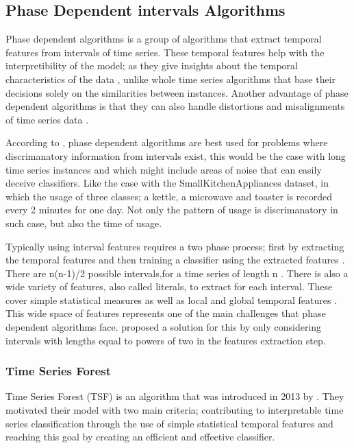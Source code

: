 \subsection{Phase Dependent intervals Algorithms}
\label{SubsectionPhaseDependent}
Phase dependent algorithms is a group of algorithms that extract temporal features from intervals of time series.
These temporal features help with the interpretibility of the model; as they give insights about the temporal characteristics of the data \cite{baydogan2016time},
unlike whole time series algorithms that base their decisions solely on the similarities between instances.
Another advantage of phase dependent algorithms is that they can also handle distortions and misalignments of time series data \cite{deng2013time}.

According to \cite{bagnall2017great}, phase dependent algorithms are best used for problems where discrimanatory information from intervals exist,
this would be the case with long time series instances and which might include areas of noise that can easily deceive classifiers.
Like the case with the SmallKitchenAppliances dataset, in which the usage of three classes; a kettle, a microwave and toaster is recorded every 2 minutes for one day.
Not only the pattern of usage is discrimanatory in such case, but also the time of usage.

Typically using interval features requires a two phase process; first by extracting the temporal features and then training a classifier using the extracted features \cite{deng2013time}.
There are n(n-1)/2 possible intervals,for a time series of length n \cite{bagnall2017great}.
There is also a wide variety of features, also called literals, to extract for each interval. These cover simple statistical measures as well as local and global temporal features \cite{santos2016literature,rodriguez2004support,deng2013time}.
This wide space of features represents one of the main challenges that phase dependent algorithms face.
\cite{rodriguez2004support} proposed a solution for this by only considering intervals with lengths equal to powers of two \cite{bagnall2017great} in the features extraction step.

\subsubsection{Time Series Forest}
\label{SubsubsectionTimeSeriesForest}
Time Series Forest (TSF) is an algorithm that was introduced in 2013 by \cite{deng2013time}.
They motivated their model with two main criteria; contributing to interpretable time series classification through
the use of simple statistical temporal features and reaching this goal by creating an efficient and effective classifier.

